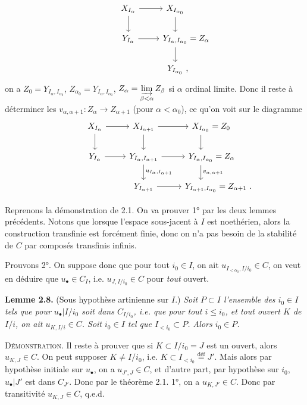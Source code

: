 \documentclass[11pt]{article}
\newcommand{\printedpage}[1]{\marginpar{\footnotesize p.~#1}}
\newcommand{\msp}[1]{\marginpar{\footnotesize [#1]}}
\begin{document}
\printedpage{19}

\[
\begin{tikzcd}
X_{I_\alpha} \arrow[r] \arrow[d] & X_{I_{\alpha_0}} \arrow[d] \\
Y_{I_\alpha} \arrow[r] & Y_{I_\alpha,I_{\alpha_0}} \rlap{${}= Z_\alpha$} \arrow[d] \\
& Y_{I_{\alpha_0}} \rlap{\ ,}
\end{tikzcd}
\]
on a $Z_0 = Y_{I_\alpha,I_{\alpha_0}}$, $Z_{\alpha_0} = Y_{I_\alpha,I_{\alpha_0}}$, $Z_\alpha = \varinjlim\limits_{\beta<\alpha} Z_\beta$ si $\alpha$ \msp{34} ordinal limite. Donc il reste à déterminer les $v_{\alpha,\alpha+1} : Z_\alpha \longrightarrow Z_{\alpha+1}$ (pour $\alpha < \alpha_0$), ce qu'on voit sur le diagramme
\[
\begin{tikzcd}
X_{I_\alpha} \arrow[r] \arrow[d] & X_{I_{\alpha+1}} \arrow[r] \arrow[d] & X_{I_{\alpha_0}} \rlap{${}= Z_0$} \arrow[d] \\
Y_{I_\alpha} \arrow[r] & Y_{I_\alpha,I_{\alpha+1}} \arrow[r] \arrow[d, "u_{I_\alpha,I_{\alpha+1}}"] & Y_{I_\alpha,I_{\alpha_0}} \rlap{${}= Z_\alpha$} \arrow[d, "v_{\alpha,\alpha+1}"] \\
& Y_{I_{\alpha+1}} \arrow[r] & Y_{I_{\alpha+1},I_{\alpha_0}} \rlap{${}= Z_{\alpha+1}\ .$}
\end{tikzcd}
\]

Reprenons la démonstration de 2.1. On va prouver 1° par les deux lemmes précédents. Notons que lorsque l'espace sous-jacent à $I$ est noethérien, alors la construction transfinie est forcément finie, donc on n'a pas besoin de la stabilité de $C$ par composés transfinis infinis.

\msp{35}

Prouvons 2°. On suppose donc que pour tout $i_0 \in I$, on ait $u_{I_{<\alpha_0},I/i_0} \in C$, on veut en déduire que $u_\bullet \in C_I$, i.e. $u_{J,I/i_0} \in C$ pour \textit{tout} ouvert.

\noindent\textbf{Lemme 2.8.} (Sous hypothèse artinienne sur $I$.) \textit{Soit $P \subset I$ l'ensemble des $i_0 \in I$ tels que pour $u_\bullet|I/i_0$ soit dans $C_{I/i_0}$, i.e. que pour tout $i \leq i_0$, et tout ouvert $K$ de $I/i$, on ait $u_{K,I/i} \in C$. Soit $i_0 \in I$ tel que $I_{<i_0} \subset P$. Alors $i_0 \in P$.}

\noindent\textsc{Démonstration}. Il reste à prouver que si $K \subset I/i_0 = J$ est un ouvert, alors $u_{K,J} \in C$. On peut supposer $K \neq I/i_0$, i.e. $K \subset I_{<i_0} \overset{\text{déf}}{=} J'$. Mais alors par hypothèse initiale sur $u_\bullet$, on a $u_{J',J} \in C$, et d'autre part, par hypothèse sur $i_0$, $u_\bullet|J'$ est dans $C_{J'}$. Donc par le théorème 2.1. 1°, on a $u_{K,J'} \in C$. Donc par transitivité $u_{K,J} \in C$, q.e.d.
\end{document}
